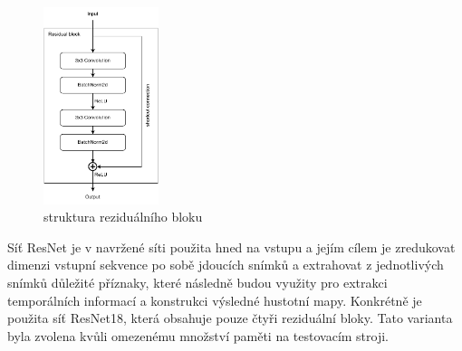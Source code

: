 \begin{figure}[h!]
	\centering
	\includegraphics[width=0.3\textwidth]{Figures/solution/residual_block.pdf}
	\caption{struktura reziduálního bloku}
	\label{fig:residual_block}
\end{figure}

Síť ResNet je v navržené síti použita hned na vstupu a jejím cílem je zredukovat dimenzi vstupní sekvence po sobě jdoucích snímků a extrahovat z jednotlivých snímků důležité příznaky, které následně budou využity pro extrakci temporálních informací a konstrukci výsledné hustotní mapy.
Konkrétně je použita síť ResNet18, která obsahuje pouze čtyři reziduální bloky.
Tato varianta byla zvolena kvůli omezenému množství paměti na testovacím stroji.

\endinput